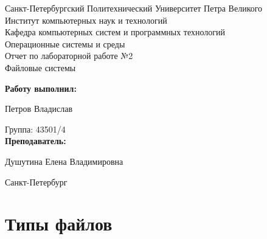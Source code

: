 \documentclass[a4paper]{article}
\begin{document}
\begin{titlepage} %

\begin{center} %

\large Санкт-Петербургский Политехнический Университет Петра Великого\\
\large Институт компьютерных наук и технологий \\
\large Кафедра компьютерных систем и программных технологий\\[6cm]

\huge Операционные системы и среды\\[0.5cm] %
\large Отчет по лабораторной работе №2\\[0.1cm]
\large Файловые системы\\[5cm]
\end{center}

\begin{flushright}
\begin{minipage}{0.5\textwidth}
\begin{flushright}
\textbf{Работу выполнил:}

Петров Владислав

{Группа:} 43501/4\\


\textbf{Преподаватель:} 

Душутина Елена Владимировна
\end{flushright}
\end{minipage} %
\end{flushright} %

\vfill %

\begin{center}

\large Санкт-Петербург\\
\large \the\year %

\end{center} %

\thispagestyle{empty} %
\end{titlepage} %

\vfill %

\section{Типы файлов}
\end{document}
